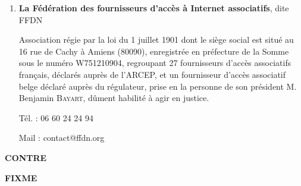 \begin{titlepage}
\begin{marges}{-0.6in}{-0.6in}
\begin{enumerate}
\item \textbf{La  Fédération  des  fournisseurs  d'accès  à  Internet associatifs}, dite FFDN

Association régie par la loi du 1\ier{} juillet 1901
dont  le  siège  social  est   situé   au   
16 rue de Cachy à Amiens (80090), 
enregistrée en préfecture de la Somme sous le numéro W751210904,
regroupant 27 fournisseurs d’accès associatifs français, déclarés auprès de l’ARCEP, et un fournisseur d’accès associatif belge déclaré auprès du régulateur,
prise en la personne de 
son président M. Benjamin \textsc{Bayart},
dûment habilité à agir en justice.

Tél. : 06 60 24 24 94

Mail : contact@ffdn.org

\end{enumerate}

\vskip 1cm

\noindent\textbf{CONTRE}

\vskip 0.5cm

\textbf{FIXME}

\end{marges}
\end{titlepage}

